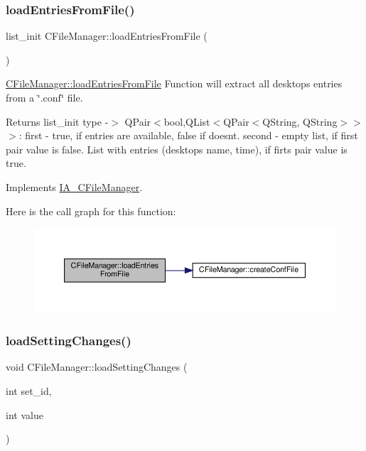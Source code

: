 \subsubsection{\texorpdfstring{load\+Entries\+From\+File()}{loadEntriesFromFile()}}
{\footnotesize\ttfamily list\+\_\+init C\+File\+Manager\+::load\+Entries\+From\+File (\begin{DoxyParamCaption}{ }\end{DoxyParamCaption})\hspace{0.3cm}{\ttfamily [virtual]}}



\hyperlink{classCFileManager_a3478ad92b96489069a2ede4140de2ba6}{C\+File\+Manager\+::load\+Entries\+From\+File} Function will extract all desktop\textquotesingle{}s entries from a \char`\"{}.\+conf\char`\"{} file. 

\begin{DoxyReturn}{Returns}
list\+\_\+init type -\/$>$ Q\+Pair$<$bool,Q\+List$<$Q\+Pair$<$\+Q\+String, Q\+String$>$$>$$>$\+: first -\/ true, if entries are available, false if doesn\textquotesingle{}t. second -\/ empty list, if first pair value is false. List with entries (desktop\textquotesingle{}s name, time), if firts pair value is true. 
\end{DoxyReturn}


Implements \hyperlink{classIA__CFileManager}{I\+A\+\_\+\+C\+File\+Manager}.

Here is the call graph for this function\+:
\nopagebreak
\begin{figure}[H]
\begin{center}
\leavevmode
\includegraphics[width=350pt]{classCFileManager_a3478ad92b96489069a2ede4140de2ba6_cgraph}
\end{center}
\end{figure}
\mbox{\label{classCFileManager_a59a238f3027f33473cfa1c2fe977521e}} 
\subsubsection{\texorpdfstring{load\+Setting\+Changes()}{loadSettingChanges()}}
{\footnotesize\ttfamily void C\+File\+Manager\+::load\+Setting\+Changes (\begin{DoxyParamCaption}\item[{int}]{set\+\_\+id,  }\item[{int}]{value }\end{DoxyParamCaption})\hspace{0.3cm}{\ttfamily [virtual]}}



